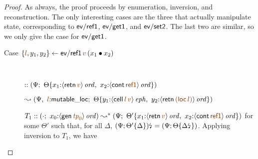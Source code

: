 \begin{proof}
As always, the proof proceeds by enumeration, inversion, and reconstruction. 
The only interesting cases are the three that actually manipulate state,
corresponding to ${\sf ev/ref1}$, ${\sf ev/get1}$, and ${\sf ev/set2}$.
The last two are similar, so we only give the case for ${\sf ev/get1}$.

\begin{description}
\item
  [Case $\trstep{\lf{l}, y_1, y_2}
         {{\sf ev/ref1}\,\lf{v}\,(\tfuser{x_1}{x_2})}$]~

\qquad 
  $:: \left(\Psi; ~ 
   \tackon{\Theta}{x_1{:}\istrue{\susp{{\sf retn}\,\lf{v}}}, ~
                   x_2{:}\istrue{\susp{{\sf cont}\,\lf{\sf ref1}}}}
   \right)$

\qquad\qquad
  $\leadsto \left(\Psi, ~ \lf{l}{:}{\sf mutable\_loc}; ~
   \tackon{\Theta}{y_1{:}\iseph{\susp{{\sf cell}\,\lf{l}\,\lf{v}}}, ~
                   y_2{:}\istrue{\susp{{\sf retn}\,\lf{({\sf loc}\,\lf{l})}}}}
   \right)$

   \medskip 
   $T_1 :: (\cdot; ~ x_0{:}\istrue{\susp{{\sf gen}\,\lf{{\it tp}_0}}}) 
    \leadsto^* \left(\Psi; ~
     \tackon{\Theta'}{x_1{:}\istrue{\susp{{\sf retn}\,\lf{v}}}, ~
                   x_2{:}\istrue{\susp{{\sf cont}\,\lf{\sf ref1}}}}
     \right)$ for some $\Theta'$ such that, for all $\Delta$,
   ${(\Psi; {\Theta'}\{{\Delta}\})}{\mbox{\lightning}}_{} = (\Psi;
   {\Theta}\{{{\Delta}{\mbox{\lightning}}_{}}\})$. Applying 
   inversion to $T_1$, we have

   \medskip


\end{description}
\end{proof}
